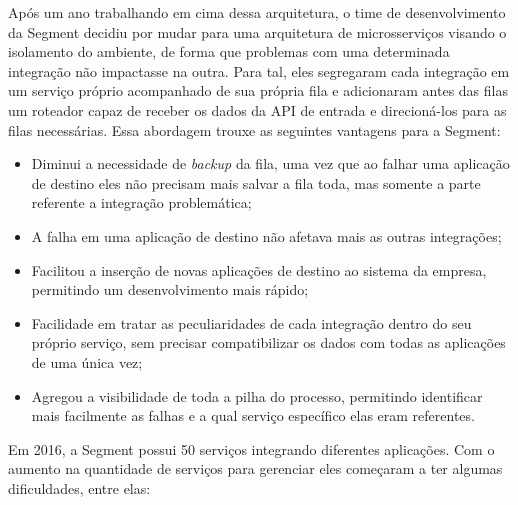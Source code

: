Após um ano trabalhando em cima dessa arquitetura, o time de desenvolvimento da Segment decidiu por
mudar para uma arquitetura de microsserviços visando o isolamento do ambiente, de forma que
problemas com uma determinada integração não impactasse na outra. Para tal, eles segregaram cada
integração em um serviço próprio acompanhado de sua própria fila e adicionaram antes das filas um
roteador capaz de receber os dados da \gls{API} de entrada e direcioná-los para as filas necessárias.
Essa abordagem trouxe as seguintes vantagens para a Segment:

\begin{itemize}
    \item Diminui a necessidade de \textit{backup} da fila, uma vez que ao falhar uma aplicação de
        destino eles não precisam mais salvar a fila toda, mas somente a parte referente a
        integração problemática;
    \item A falha em uma aplicação de destino não afetava mais as outras integrações;
    \item Facilitou a inserção de novas aplicações de destino ao sistema da empresa, permitindo um
        desenvolvimento mais rápido;
    \item Facilidade em tratar as peculiaridades de cada integração dentro do seu próprio serviço,
        sem precisar compatibilizar os dados com todas as aplicações de uma única vez;
    \item Agregou a visibilidade de toda a pilha do processo, permitindo identificar mais facilmente
        as falhas e a qual serviço específico elas eram referentes.
\end{itemize}

Em 2016, a Segment possui 50 serviços integrando diferentes aplicações. Com o aumento na quantidade
de serviços para gerenciar eles começaram a ter algumas dificuldades, entre elas:

